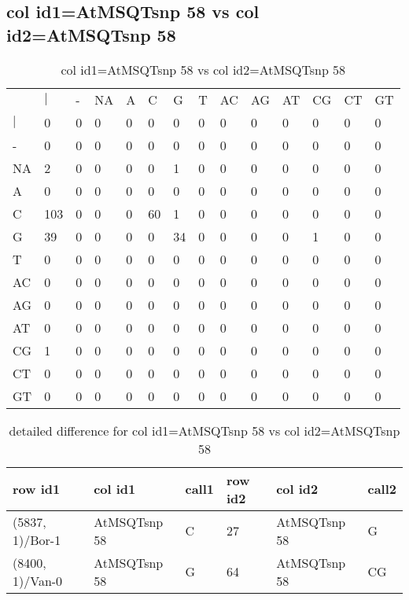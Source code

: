 \subsection{col id1=AtMSQTsnp 58 vs col id2=AtMSQTsnp 58}
\begin{center}
\begin{longtable}{|l|l|l|l|l|l|l|l|l|l|l|l|l|l|}
\caption{col id1=AtMSQTsnp 58 vs col id2=AtMSQTsnp 58} \label{table_dm746}\\
\hline
\\
\hline
&$|$&-&NA&A&C&G&T&AC&AG&AT&CG&CT&GT\\
$|$&0&0&0&0&0&0&0&0&0&0&0&0&0\\
-&0&0&0&0&0&0&0&0&0&0&0&0&0\\
NA&2&0&0&0&0&1&0&0&0&0&0&0&0\\
A&0&0&0&0&0&0&0&0&0&0&0&0&0\\
C&103&0&0&0&60&1&0&0&0&0&0&0&0\\
G&39&0&0&0&0&34&0&0&0&0&1&0&0\\
T&0&0&0&0&0&0&0&0&0&0&0&0&0\\
AC&0&0&0&0&0&0&0&0&0&0&0&0&0\\
AG&0&0&0&0&0&0&0&0&0&0&0&0&0\\
AT&0&0&0&0&0&0&0&0&0&0&0&0&0\\
CG&1&0&0&0&0&0&0&0&0&0&0&0&0\\
CT&0&0&0&0&0&0&0&0&0&0&0&0&0\\
GT&0&0&0&0&0&0&0&0&0&0&0&0&0\\
\hline
\end{longtable}
\end{center}

\begin{center}
\begin{longtable}{|l|l|l|l|l|l|}
\caption{detailed difference for col id1=AtMSQTsnp 58 vs col id2=AtMSQTsnp 58} \label{table_dm747}\\
\hline
row id1&col id1&call1&row id2&col id2&call2\\
\hline
(5837, 1)/Bor-1&AtMSQTsnp 58&C&27&AtMSQTsnp 58&G\\
(8400, 1)/Van-0&AtMSQTsnp 58&G&64&AtMSQTsnp 58&CG\\
\hline
\end{longtable}
\end{center}

